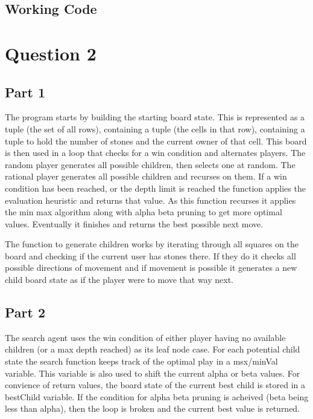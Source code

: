\documentclass[12pt]{article}
\begin{document}
\subsection*{Working Code}


\section*{Question 2}
\subsection*{Part 1}
The program starts by building the starting board state. This is represented as a tuple (the set of all rows), containing a tuple (the cells in that row), containing a tuple to hold the number of stones and the current owner of that cell. This board is then used in a loop that checks for a win condition and alternates players. The random player generates all possible children, then selects one at random. The rational player generates all possible children and recurses on them. If a win condition has been reached, or the depth limit is reached the function applies the evaluation heuristic and returns that value. As this function recurses it applies the min max algorithm along with alpha beta pruning to get more optimal values. Eventually it finishes and returns the best possible next move.

The function to generate children works by iterating through all squares on the board and checking if the current user has stones there. If they do it checks all possible directions of movement and if movement is possible it generates a new child board state as if the player were to move that way next.

\subsection*{Part 2}
The search agent uses the win condition of either player having no available children (or a max depth reached) as its leaf node case. For each potential child state the search function keeps track of the optimal play in a msx/minVal variable. This variable is also used to shift the current alpha or beta values. For convience of return values, the board state of the current best child is stored in a bestChild variable. If the condition for alpha beta pruning is acheived (beta being less than alpha), then the loop is broken and the current best value is returned.
\end{document}
